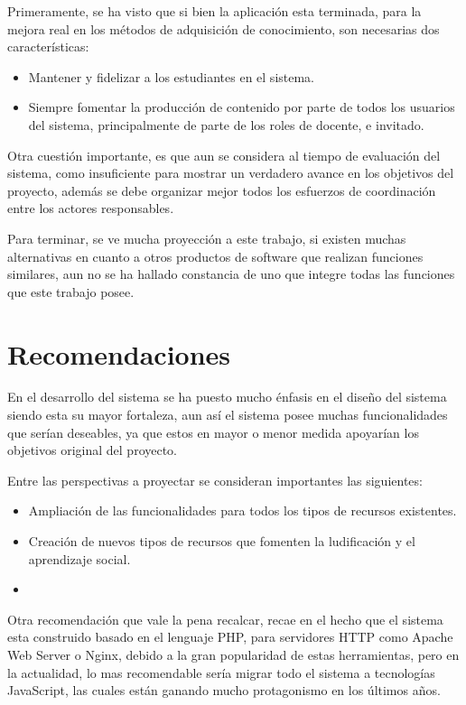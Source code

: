 Primeramente, se ha visto que si bien la aplicación esta terminada, para la
mejora real en los métodos de adquisición de conocimiento, son necesarias dos
características:

\begin{itemize}
\item Mantener y fidelizar a los estudiantes en el sistema.
\item Siempre fomentar la producción de contenido por parte de todos los
usuarios del sistema, principalmente de parte de los roles de docente, e
invitado.
\end{itemize}

Otra cuestión importante, es que aun se considera al tiempo de evaluación del
sistema, como insuficiente para mostrar un verdadero avance en los objetivos del
proyecto, además se debe organizar mejor todos los esfuerzos de coordinación
entre los actores responsables.

Para terminar, se ve mucha proyección a este trabajo, si existen muchas
alternativas en cuanto a otros productos de software que realizan funciones
similares, aun no se ha hallado constancia de uno que integre todas las
funciones que este trabajo posee.

\section{Recomendaciones}
En el desarrollo del sistema se ha puesto mucho énfasis en el diseño del sistema
siendo esta su mayor fortaleza, aun así el sistema posee muchas funcionalidades
que serían deseables, ya que estos en mayor o menor medida apoyarían los
objetivos original del proyecto.

Entre las perspectivas a proyectar se consideran importantes las siguientes:

\begin{itemize}
\item Ampliación de las funcionalidades para todos los tipos de recursos
existentes.
\item Creación de nuevos tipos de recursos que fomenten la ludificación y el
aprendizaje social.
\item 
\end{itemize}

Otra recomendación que vale la pena recalcar, recae en el hecho que el sistema
esta construido basado en el lenguaje PHP, para servidores HTTP como Apache Web
Server o Nginx, debido a la gran popularidad de estas herramientas, pero en la
actualidad, lo mas recomendable sería migrar todo el sistema a tecnologías
JavaScript, las cuales están ganando mucho protagonismo en los últimos años.

